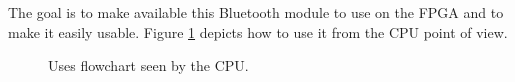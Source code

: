 \documentclass[11pt]{article}
\begin{document}
The goal is to make available this Bluetooth module to use on the FPGA and to make it easily usable. Figure \ref{uses_flowchart} depicts how to use it from the CPU point of view.

\begin{figure}[H]
        \caption{Uses flowchart seen by the CPU.}
        \label{uses_flowchart}
\end{figure}
\newpage
\end{document}
